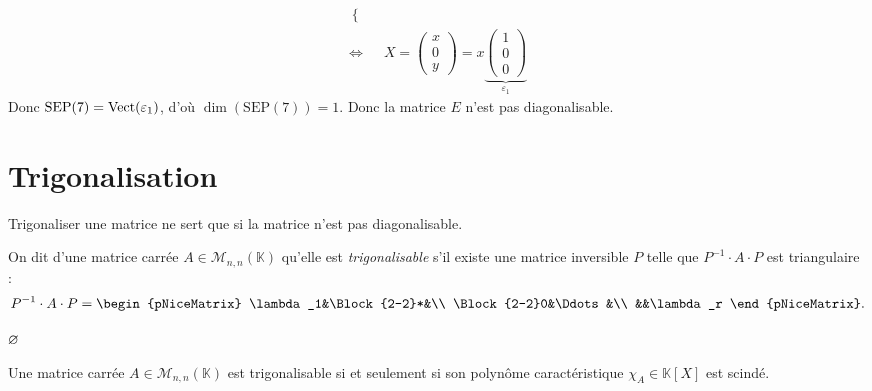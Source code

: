\begin{exo}
\begin{align*}
\begin{cases}
		\end{cases}\\
		\iff& X = \begin{pmatrix}
			x\\0\\y
		\end{pmatrix} = x \underbrace{\begin{pmatrix}
			1\\0\\0
		\end{pmatrix}}_{\varepsilon_1}
	\end{align*}
	Donc $\mathrm{SEP}(7) = \operatorname{Vect}(\varepsilon_1)$, d'où $\dim(\mathrm{SEP}(7)) = 1$. Donc la matrice $E$\/ n'est pas diagonalisable.
\end{exo}

\section{Trigonalisation}

Trigonaliser une matrice ne sert que si la matrice n'est pas diagonalisable.

\begin{defn}
	On dit d'une matrice carrée $A \in \mathscr{M}_{n,n}(\mathds{K})$\/ qu'elle est {\it trigonalisable}\/ s'il existe une matrice inversible $P$\/ telle que $P^{-1} \cdot A \cdot P$\/ est triangulaire : \[
		P^{-1} \cdot A \cdot P = \begin{pNiceMatrix}
			\lambda_1&\Block{2-2}*&\\
			\Block{2-2}0&\Ddots&\\
			&&\lambda_r
		\end{pNiceMatrix}
	.\]
\end{defn}

\begin{rmk}
	$\varnothing$\/
\end{rmk}

\begin{thm}
	Une matrice carrée $A \in \mathscr{M}_{n,n}(\mathds{K})$\/ est trigonalisable si et seulement si son polynôme caractéristique $\chi_A \in \mathds{K}[X]$\/ est scindé.
\end{thm}
